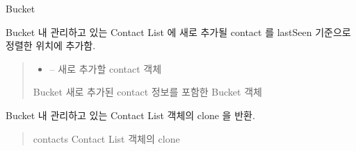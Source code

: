 \documentclass[a4paper,10pt,english]{sphinxmanual}
\begin{document}
\begin{fulllineitems}
\label{\detokenize{_kademlia:Bucket}}
\pysigstartsignatures
{}
\pysigstopsignatures
\sphinxAtStartPar
Bucket

\begin{fulllineitems}
\label{\detokenize{_kademlia:Bucket.add}}
\pysigstartsignatures
{}
\pysigstopsignatures
\sphinxAtStartPar
Bucket 내 관리하고 있는 Contact List 에 새로 추가될 contact 를 lastSeen 기준으로 정렬한 위치에 추가함.
\begin{quote}\begin{description}
\begin{itemize}
\item {} 
\sphinxAtStartPar
{} – 새로 추가할 contact 객체

\end{itemize}

\sphinxAtStartPar
Bucket \sphinxhyphen{} 새로 추가된 contact 정보를 포함한 Bucket 객체

\end{description}\end{quote}

\end{fulllineitems}


\begin{fulllineitems}
\label{\detokenize{_kademlia:Bucket.contacts}}
\pysigstartsignatures
{}
\pysigstopsignatures
\sphinxAtStartPar
Bucket 내 관리하고 있는 Contact List 객체의 clone 을 반환.
\begin{quote}\begin{description}
\sphinxAtStartPar
contacts \sphinxhyphen{} Contact List 객체의 clone

\end{description}\end{quote}


\end{fulllineitems}
\end{fulllineitems}
\end{document}
